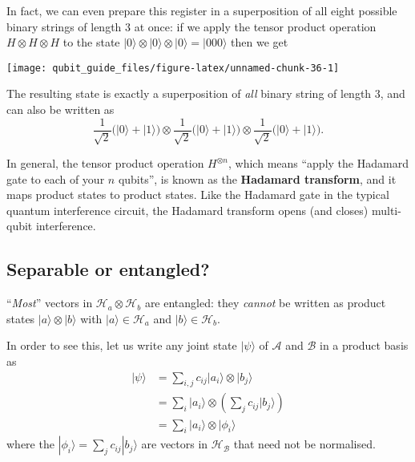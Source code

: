 \documentclass[fleqn]{article}
\newenvironment{idea}{\noindent}{\medskip}
\begin{document}
In fact, we can even prepare this register in a superposition of all eight possible binary strings of length \(3\) at once: if we apply the tensor product operation \(H\otimes H\otimes H\) to the state \(|0\rangle\otimes|0\rangle\otimes|0\rangle = |000\rangle\) then we get

\begin{center}\texttt{[image: qubit\_guide\_files/figure-latex/unnamed-chunk-36-1]} \end{center}

The resulting state is exactly a superposition of \emph{all} binary string of length \(3\), and can also be written as
\[
  \frac{1}{\sqrt{2}} \big(|0\rangle + |1\rangle\big)
  \otimes
  \frac{1}{\sqrt{2}} \big(|0\rangle + |1\rangle\big)
  \otimes
  \frac{1}{\sqrt{2}} \big(|0\rangle + |1\rangle\big).
\]

In general, the tensor product operation \(H^{\otimes n}\), which means ``apply the Hadamard gate to each of your \(n\) qubits'', is known as the \textbf{Hadamard transform}, and it maps product states to product states.
Like the Hadamard gate in the typical quantum interference circuit, the Hadamard transform opens (and closes) multi-qubit interference.

\hypertarget{separable-or-entangled}{%
\subsection{Separable or entangled?}\label{separable-or-entangled}}

\begin{idea}
``\emph{Most}'' vectors in \(\mathcal{H}_a\otimes \mathcal{H}_b\) are entangled: they \emph{cannot} be written as product states \(|a\rangle\otimes|b\rangle\) with \(|a\rangle\in\mathcal{H}_a\) and \(|b\rangle\in\mathcal{H}_b\).

\end{idea}

In order to see this, let us write any joint state \(|\psi\rangle\) of \(\mathcal{A}\) and \(\mathcal{B}\) in a product basis as
\[
  \begin{aligned}
    |\psi\rangle
    &= \sum_{i,j} c_{ij}|a_i\rangle\otimes|b_j\rangle
  \\&= \sum_i|a_i\rangle\otimes\left(\sum_j c_{ij}|b_j\rangle\right)
  \\&= \sum_i|a_i\rangle\otimes|\phi_i\rangle
  \end{aligned}
\tag{$\ddagger$}
\]
where the \(|\phi_i\rangle=\sum_j c_{ij}|b_j\rangle\) are vectors in \(\mathcal{H}_{\mathcal{B}}\) that need not be normalised.
\end{document}
